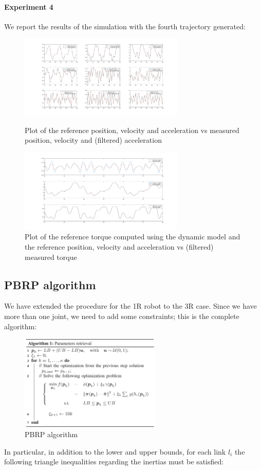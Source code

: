 \documentclass{article}
\begin{document}
\paragraph{Experiment 4}
We report the results of the simulation with the fourth trajectory generated:
\begin{figure}[!htbp]
\centering
\includegraphics[width=0.7\textwidth]{images/3-dof/experiment4_traj.png}
\caption{Plot of the reference position, velocity and acceleration vs measured position, velocity and (filtered) acceleration}
\includegraphics[width=0.7\textwidth]{images/3-dof/experiment4.png}
\caption{Plot of the reference torque computed using the dynamic model and the reference position, velocity and acceleration vs (filtered) measured torque}
\end{figure}
\pagebreak


\subsection{PBRP algorithm}
We have extended the procedure for the 1R robot to the 3R case. Since we have more than one joint, we need to add some constraints; this is the complete algorithm:
\FloatBarrier
\begin{figure}[!htbp]
\centering
\includegraphics[width=0.6\textwidth]{images/3-dof/algorithm.png}
\caption{PBRP algorithm}
\end{figure}
\FloatBarrier
In particular, in addition to the lower and upper bounds,  for each link $l_i$ the following triangle inequalities regarding the inertias  must be satisfied:
\end{document}
